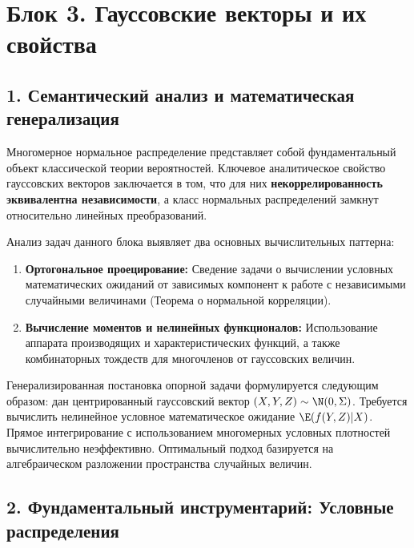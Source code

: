 \section*{Блок 3. Гауссовские векторы и их свойства}

\subsection*{1. Семантический анализ и математическая генерализация}

Многомерное нормальное распределение представляет собой фундаментальный объект классической теории вероятностей. Ключевое аналитическое свойство гауссовских векторов заключается в том, что для них \textbf{некоррелированность эквивалентна независимости}, а класс нормальных распределений замкнут относительно линейных преобразований.

Анализ задач данного блока выявляет два основных вычислительных паттерна:
\begin{enumerate}
    \item \textbf{Ортогональное проецирование:} Сведение задачи о вычислении условных математических ожиданий от зависимых компонент к работе с независимыми случайными величинами (Теорема о нормальной корреляции).
    \item \textbf{Вычисление моментов и нелинейных функционалов:} Использование аппарата производящих и характеристических функций, а также комбинаторных тождеств для многочленов от гауссовских величин.
\end{enumerate}

Генерализированная постановка опорной задачи формулируется следующим образом: дан центрированный гауссовский вектор $(X, Y, Z) \sim \N(0, \Sigma)$. Требуется вычислить нелинейное условное математическое ожидание $\E(f(Y,Z) | X)$. Прямое интегрирование с использованием многомерных условных плотностей вычислительно неэффективно. Оптимальный подход базируется на алгебраическом разложении пространства случайных величин.

\subsection*{2. Фундаментальный инструментарий: Условные распределения}

